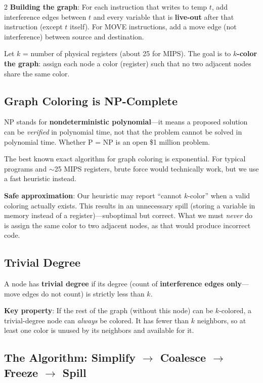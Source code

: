 \documentclass[9pt,landscape]{extarticle}
\begin{document}
\begin{multicols}{2}
\textbf{Building the graph}: For each instruction that writes to temp $t$, add interference edges between $t$ and every variable that is \textbf{live-out} after that instruction (except $t$ itself). For MOVE instructions, add a move edge (not interference) between source and destination.

Let $k$ = number of physical registers (about 25 for MIPS). The goal is to \textbf{$k$-color the graph}: assign each node a color (register) such that no two adjacent nodes share the same color.

\subsection{Graph Coloring is NP-Complete}

NP stands for \textbf{nondeterministic polynomial}---it means a proposed solution can be \emph{verified} in polynomial time, not that the problem cannot be solved in polynomial time. Whether P = NP is an open \$1 million problem.

The best known exact algorithm for graph coloring is exponential. For typical programs and $\sim$25 MIPS registers, brute force would technically work, but we use a fast heuristic instead.

\textbf{Safe approximation}: Our heuristic may report ``cannot $k$-color'' when a valid coloring actually exists. This results in an unnecessary spill (storing a variable in memory instead of a register)---suboptimal but correct. What we must \emph{never} do is assign the same color to two adjacent nodes, as that would produce incorrect code.

\subsection{Trivial Degree}

A node has \textbf{trivial degree} if its degree (count of \textbf{interference edges only}---move edges do not count) is strictly less than $k$.

\textbf{Key property}: If the rest of the graph (without this node) can be $k$-colored, a trivial-degree node can \emph{always} be colored. It has fewer than $k$ neighbors, so at least one color is unused by its neighbors and available for it.

\subsection{The Algorithm: Simplify $\to$ Coalesce $\to$ Freeze $\to$ Spill}


\end{multicols}
\end{document}
